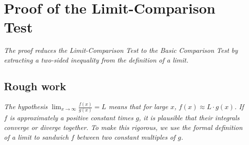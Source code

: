 \section{Proof of the Limit-Comparison Test}
\label{sec:12.10}

\textit{The proof reduces the Limit-Comparison Test to the Basic Comparison Test by extracting a two-sided inequality from the definition of a limit.}

\subsection*{Rough work}

\textit{The hypothesis $\lim_{x\to\infty}\frac{f(x)}{g(x)}=L$ means that for large $x$, $f(x)\approx L\cdot g(x)$.  If $f$ is approximately a positive constant times $g$, it is plausible that their integrals converge or diverge together.  To make this rigorous, we use the formal definition of a limit to sandwich $f$ between two constant multiples of $g$.}

